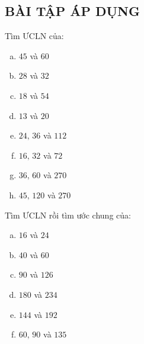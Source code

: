 \subsection{BÀI TẬP ÁP DỤNG}
\begin{bt}  
Tìm $\text{ƯCLN}$ của:
\begin{multicols}{2}
\begin{enumerate}[a)]
\item $45$ và $60$     
\item $28$ và $32$
\item $18$ và $54$
\item $13$ và $20$
\item $24,\,36$ và $112$
\item $16,\,32$ và $72$
\item $36,\,60$ và $270$
\item $45,\,120$ và $270$
\end{enumerate}
\end{multicols}
\end{bt}   \begin{bt}
Tìm $\text{ƯCLN}$ rồi tìm ước chung của:
\begin{multicols}{2}
\begin{enumerate}[a)]
\item $16$ và $24$     
\item $40$ và $60$
\item $90$ và $126$
\item $180$ và $234$
\item $144$ và $192$
\item $60,\,90$ và $135$
\end{enumerate}
\end{multicols}

\end{bt}
